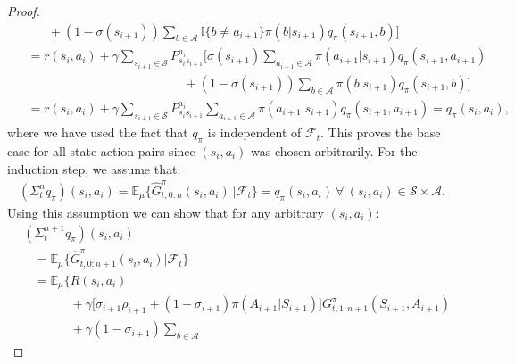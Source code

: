 \begin{proof}
\begin{align*}
    & \hspace{25pt} + (1-\sigma(s_{i+1}))\sum_{b \in \mathcal{A}} 
    	\mathbb{I}\{b \neq a_{i+1} \} \pi(b| s_{i+1}) q_\pi(s_{i+1},b) \Big] \nonumber \\
    & \hspace{5pt} = r(s_i, a_i) + \gamma \sum_{s_{i+1} \in \mathcal{S}} 
    	P^{a_i}_{s_i s_{i+1}} 
    	\Big[ \sigma(s_{i+1}) \sum_{a_{i+1} \in \mathcal{A}} \pi(a_{i+1} |s_{i+1} ) 
        q_\pi(s_{i+1}, a_{i+1}) 
        \nonumber \\
	& \hspace{155pt} 
    	+ (1-\sigma(s_{i+1}) )\sum_{b \in \mathcal{A}} \pi(b|s_{i+1})
        q_\pi(s_{i+1},b) \Big] 
        \nonumber \\
   	& \hspace{5pt} = r(s_i, a_i) + \gamma \sum_{s_{i+1} \in \mathcal{S}} P^{a_i}_{s_i s_{i+1}} 
    	\sum_{a_{i+1} \in \mathcal{A}} \pi(a_{i+1} |s_{i+1} ) q_\pi(s_{i+1}, a_{i+1} ) 
   		= q_\pi(s_i, a_i),
\end{align*}
%
where we have used the fact that $q_\pi$ is independent of $\mathcal{F}_t$. 
This proves the base case for all state-action pairs since $(s_i,a_i)$ was chosen arbitrarily. 
For the induction step, we assume that:
%
\begin{align*}
(\Sigma^n_t q_\pi)(s_i, a_i) = \mathbb{E}_\mu \{\hat{G}^{\pi}_{t, 0:n}(s_i, a_i) \ \big| 
	\mathcal{F}_t \} = q_\pi(s_i, a_i) \ \forall \ (s_i,a_i) \in \mathcal{S} \times \mathcal{A}.
\end{align*}
%
Using this assumption we can show that for any arbitrary $(s_i,a_i)$:
\begin{align*}
& (\Sigma^{n+1}_t q_\pi)(s_i, a_i) 
	\nonumber \\ 
	& \hspace{10pt} = \mathbb{E}_\mu \Big\{ \hat{G}^{\pi}_{t, 0:n+1}(s_i, a_i) 
    				\big| \mathcal{F}_t \Big\} 
                    \nonumber \\
	& \hspace{10pt} = \mathbb{E}_\mu \Big\{R(s_i, a_i)  
    				\nonumber \\
    & \hspace{45pt} + \gamma\big[ \sigma_{i+1} \rho_{i+1} 
    				+ (1-\sigma_{i+1}) \pi(A_{i+1}| S_{i+1})\big] G^{\pi}_{t, 1:n+1}
                    (S_{i+1}, A_{i+1})  \nonumber \\
    & \hspace{45pt} + \gamma (1-\sigma_{i+1})\sum_{b \in \mathcal{A}} 

\end{align*}
\end{proof}
